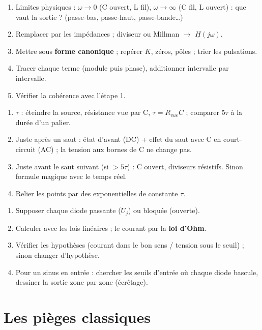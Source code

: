 \begin{exbox}[title={Fonction de transfert et Bode (C04, C05)}]
\begin{enumerate}
  \item Limites physiques : $\omega\to0$ (C ouvert, L fil), $\omega\to\infty$ (C fil, L
        ouvert) : que vaut la sortie ? (passe-bas, passe-haut, passe-bande\ldots)
  \item Remplacer par les impédances ; diviseur ou Millman $\to$ $\underline H(j\omega)$.
  \item Mettre sous \textbf{forme canonique} ; repérer $K$, zéros, pôles ; trier les
        pulsations.
  \item Tracer chaque terme (module puis phase), additionner intervalle par intervalle.
  \item Vérifier la cohérence avec l'étape 1.
\end{enumerate}
\end{exbox}

\begin{exbox}[title={Signal carré sur un circuit RC (C06)}]
\begin{enumerate}
  \item $\tau$ : éteindre la source, résistance vue par C, $\tau = R_{vue}C$ ; comparer
        $5\tau$ à la durée d'un palier.
  \item Juste après un saut : état d'avant (DC) + effet du saut avec C en court-circuit
        (AC) ; la tension aux bornes de C ne change pas.
  \item Juste avant le saut suivant (si $>5\tau$) : C ouvert, diviseurs résistifs. Sinon
        formule magique avec le temps réel.
  \item Relier les points par des exponentielles de constante $\tau$.
\end{enumerate}
\end{exbox}

\begin{exbox}[title={Circuit à diodes (C07)}]
\begin{enumerate}
  \item Supposer chaque diode passante ($U_j$) ou bloquée (ouverte).
  \item Calculer avec les lois linéaires ; le courant par la \textbf{loi d'Ohm}.
  \item Vérifier les hypothèses (courant dans le bon sens / tension sous le seuil) ; sinon
        changer d'hypothèse.
  \item Pour un sinus en entrée : chercher les seuils d'entrée où chaque diode bascule,
        dessiner la sortie zone par zone (écrêtage).
\end{enumerate}
\end{exbox}

\section{Les pièges classiques}

